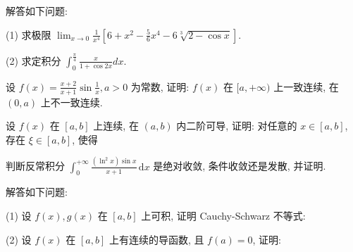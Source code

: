 解答如下问题:\par
(1) 求极限 $\lim_{x\to 0}\frac{1}{x^4}\left[6 + x^2 -\frac{5}{6} x^4 -6\sqrt[3]{2 - \cos x}\right].$\par
(2) 求定积分  $\int_{0}^{\frac{\pi}{4}}\frac{x}{1+\cos2x}dx.$\par
设 $f(x) = \frac{x + 2}{x + 1} \sin \frac{1}{x}, a > 0$ 为常数, 证明: $f(x)$ 在 $[a, +\infty)$ 上一致连续, 在 $(0, a)$ 上不一致连续.\par
\par{}
设 $f(x)$ 在 $[a, b]$ 上连续, 在 $(a, b)$ 内二阶可导, 证明: 对任意的 $x \in [a, b]$, 存在 $\xi \in [a, b]$, 使得\par
\nopagebreak[4]
判断反常积分 $\int_0^{+\infty} \frac{(\ln^2 x) \sin x}{x + 1} \, \mathrm{d}x$ 是绝对收敛, 条件收敛还是发散, 并证明.\par
解答如下问题:\par
\par{}
(1) 设 $f(x), g(x)$ 在 $[a, b]$ 上可积, 证明 Cauchy-Schwarz 不等式:\par
\nopagebreak[4]
\par{}
(2) 设 $f(x)$ 在 $[a, b]$ 上有连续的导函数, 且 $f(a) = 0$, 证明:\par
\nopagebreak[4]
